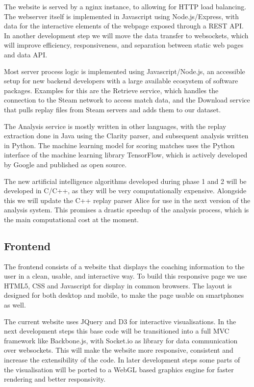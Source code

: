 \documentclass[12pt]{article} %
\begin{document}
The website is served by a nginx instance, to allowing for HTTP load balancing. The webserver itself is implemented in Javascript using Node.js/Express, with data for the interactive elements of the webpage exposed through a REST API. In another development step we will move the data transfer to websockets, which will improve efficiency, responsiveness, and separation between static web pages and data API.

Most server process logic is implemented using Javascript/Node.js, an accessible setup for new backend developers with a large available ecosystem of software packages. Examples for this are the Retrieve service, which handles the connection to the Steam network to access match data, and the Download service that pulls replay files from Steam servers and adds them to our dataset.

The Analysis service is mostly written in other languages, with the replay extraction done in Java using the Clarity parser, and subsequent analysis written in Python. The machine learning model for scoring matches uses the Python interface of the machine learning library TensorFlow, which is actively developed by Google and published as open source.

The new artificial intelligence algorithms developed during phase 1 and 2 will be developed in C/C++, as they will be very computationally expensive. Alongside this we will update the C++ replay parser Alice for use in the next version of the analysis system. This promises a drastic speedup of the analysis process, which is the main computational cost at the moment. 

\subsection{Frontend}

The frontend consists of a website that displays the coaching information to the user in a clean, usable, and interactive way. To build this responsive page we use HTML5, CSS and Javascript for display in common browsers. The layout is designed for both desktop and mobile, to make the page usable on smartphones as well.

The current website uses JQuery and D3 for interactive visualisations. In the next development steps this base code will be transitioned into a full MVC framework like Backbone.js, with Socket.io as library for data communication over websockets. This will make the website more responsive, consistent and increase the extensibility of the code. In later development steps some parts of the visualisation will be ported to a WebGL based graphics engine for faster rendering and better responsivity.
\end{document}
